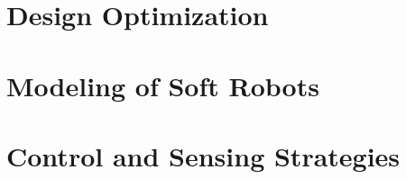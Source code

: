 \documentclass[print,thumbmain,final]{src/thesis}  %
\author{Brandon Jonathan Caasenbrood}
\begin{document}
\thispagestyle{empty}







\cleardoublepage
{}
\tableofcontents

\newpage


\isstarredchapterfalse          %


\cleardoublepage
\part{Design Optimization}\label{part: design}

\cleardoublepage
\part{Modeling of Soft Robots}\label{part: model}


\part{Control and Sensing Strategies}\label{part: control}
% 
% 
\end{document}
